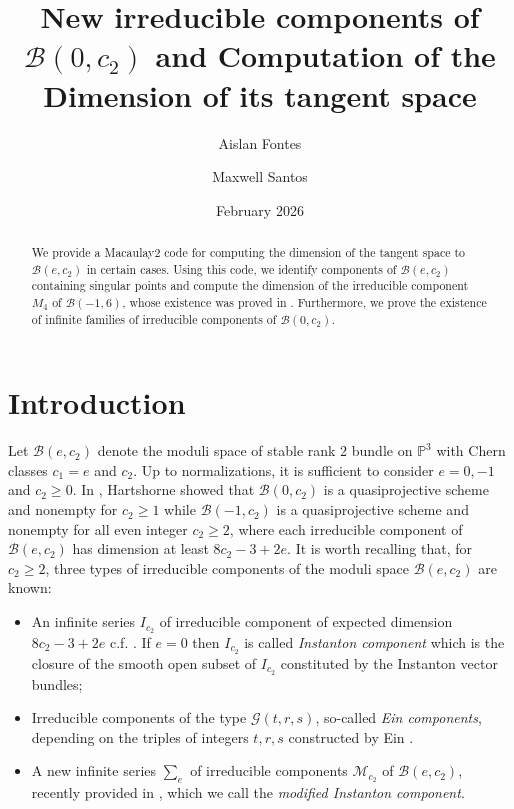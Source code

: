 \documentclass[twoside,reqno]{amsart}
\title[New irreducible components of $\mathcal{B}(0,c_2)$]{New irreducible components of $\mathcal{B}(0,c_2)$ 
and Computation of the Dimension of its tangent space}
\author[A. Fontes]{Aislan Fontes}
\author[M. Santos]{Maxwell Santos}
\date{February 2026}
\theoremstyle{plain}
\begin{document}
\begin{abstract}
We provide a Macaulay2 code for computing the dimension of the tangent space to $\mathcal{B}(e,c_2)$ in certain cases. Using this 
code, we identify components of $\mathcal{B}(e,c_2)$ containing singular points and compute the dimension 
of the irreducible component $M_4$ of $\mathcal{B}(-1,6)$, whose existence was proved in 
\cite{MF2021}. Furthermore, we prove the existence of infinite families of 
irreducible components of $\mathcal{B}(0,c_2)$.
\end{abstract}

\maketitle
\tableofcontents

\section{Introduction}



 Let $\mathcal{B}(e,c_2)$ denote the moduli space of stable rank 2 bundle on $\mathbb{P}^3$ with Chern classes $c_1=e$ and $c_2$. Up to normalizations, it is sufficient to consider $e=0, -1$ and $c_2\geq0$. In \cite{H78}, Hartshorne showed that  $\mathcal{B}(0,c_2)$ is a quasiprojective scheme and nonempty for $c_2\geq1$ while $\mathcal{B}(-1,c_2)$ is a quasiprojective scheme and nonempty for all even integer $c_2\geq2$, where each irreducible component of $\mathcal{B}(e,c_2)$ has dimension at least $8c_2-3+2e$. It is worth recalling that, for $c_2\geq2$, three types of irreducible components of the moduli space $\mathcal{B}(e,c_2)$ are known: 
  \begin{itemize}
      \item An infinite series $I_{c_2}$ of irreducible component of expected dimension $8c_2-3+2e$ c.f. \cite{H78}. If $e=0$ then  $I_{c_2}$ is called \textit{Instanton component} which is the closure 
of the smooth open subset of $I_{c_2}$ constituted by the Instanton vector bundles;
\item Irreducible components of the type $\mathcal{G}(t,r,s)$, so-called \textit{Ein components}, depending on the triples of 
integers $t, r, s$ constructed by Ein \cite{Ein88}.
\item A new infinite series $\sum_e$ of irreducible components $\mathcal{M}_{c_2}$ of 
$\mathcal{B}(e,c_2)$, recently provided in \cite{tikhomirov2019}, which we call the \textit{modified Instanton component}.
  \end{itemize} %
  
\end{document}
